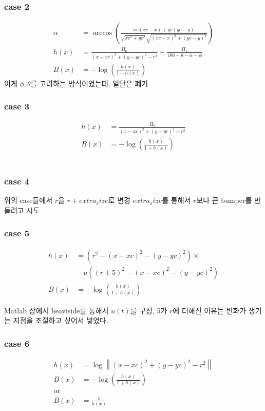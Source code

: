 \documentclass[journal]{IEEEtran}
\begin{document}
\subsubsection{case 2}
\begin{align*}
	\alpha&=\arccos\left(\frac{xc(xc-x)+yc(yc-y)}{\sqrt{xc^2+yc^2}\sqrt{(xc-x)^2+(yc-y)^2}}\right)\\
	h(x)&=\frac{H_0}{(x-xc)^2+(y-yc)^2-r^2}+\frac{H_1}{180-\theta-\alpha-\phi}\\
	B(x)&=-\log\left( \frac{h(x)}{1+h(x)}\right)
\end{align*}
이게 $\phi, \theta$를 고려하는 방식이었는데, 일단은 폐기
\\
\subsubsection{case 3}

\begin{align*}
	h(x)&=\frac{H_0}{(x-xc)^2+(y-yc)^2-r^2}\\
	B(x)&=-\log\left( \frac{h(x)}{1+h(x)}\right)
\end{align*}
\\
\subsubsection{case 4}

위의 case들에서 $r$을 $r+extra_size$로 변경 $extra_size$를 통해서 $r$보다 큰 bumper를 만들려고 시도
\\
\subsubsection{case 5}

\begin{align*}
	h(x)&=(r^2-(x-xc)^2-(y-yc)^2)\times\\
	 &\quad u((r+5)^2-(x-xc)^2-(y-yc)^2)\\
	B(x)&=-\log\left( \frac{h(x)}{1+h(x)}\right)
\end{align*}

Matlab 상에서 heaviside를 통해서 $u(t)$를 구성, 5가 $r$에 더해진 이유는 변화가 생기는 지점을 조절하고 싶어서 넣었다.
\\
\subsubsection{case 6}

\begin{align*}
	h(x)&=\log \left\| (x-xc)^2+(y-yc)^2-r^2 \right\|  \\
	B(x)&=-\log\left( \frac{h(x)}{1+h(x)}\right)\\
	\text{or}\\
	B(x)&=\frac{1}{h(x)}
\end{align*}
\end{document}

